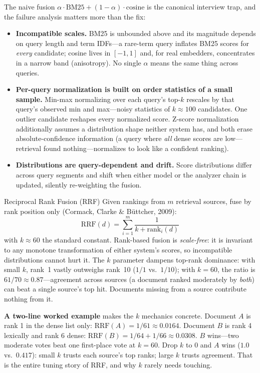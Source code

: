 The naive fusion $\alpha \cdot \text{BM25} + (1-\alpha) \cdot \text{cosine}$ is the canonical interview trap, and the failure analysis matters more than the fix:

\begin{itemize}
    \item \textbf{Incompatible scales.} BM25 is unbounded above and its magnitude depends on query length and term IDFs---a rare-term query inflates BM25 scores for \textit{every} candidate; cosine lives in $[-1, 1]$ and, for real embedders, concentrates in a narrow band (anisotropy). No single $\alpha$ means the same thing across queries.
    \item \textbf{Per-query normalization is built on order statistics of a small sample.} Min-max normalizing over each query's top-$k$ rescales by that query's observed min and max---noisy statistics of $k \approx 100$ candidates. One outlier candidate reshapes every normalized score. Z-score normalization additionally assumes a distribution shape neither system has, and both erase absolute-confidence information (a query where \textit{all} dense scores are low---retrieval found nothing---normalizes to look like a confident ranking).
    \item \textbf{Distributions are query-dependent and drift.} Score distributions differ across query segments and shift when either model or the analyzer chain is updated, silently re-weighting the fusion.
\end{itemize}

\begin{mathresult}{Reciprocal Rank Fusion (RRF)}
Given rankings from $m$ retrieval sources, fuse by rank position only (Cormack, Clarke \& B\"uttcher, 2009):
\[
\text{RRF}(d) = \sum_{i=1}^{m} \frac{1}{k + \text{rank}_i(d)}
\]
with $k \approx 60$ the standard constant. Rank-based fusion is \textit{scale-free}: it is invariant to any monotone transformation of either system's scores, so incompatible distributions cannot hurt it. The $k$ parameter dampens top-rank dominance: with small $k$, rank~1 vastly outweighs rank~10 ($1/1$ vs.\ $1/10$); with $k = 60$, the ratio is $61/70 \approx 0.87$---agreement across sources (a document ranked moderately by \textit{both}) can beat a single source's top hit. Documents missing from a source contribute nothing from it.
\end{mathresult}

\textbf{A two-line worked example} makes the $k$ mechanics concrete. Document $A$ is rank 1 in the dense list only: $\text{RRF}(A) = 1/61 \approx 0.0164$. Document $B$ is rank 4 lexically and rank 6 dense: $\text{RRF}(B) = 1/64 + 1/66 \approx 0.0308$. $B$ wins---two moderate votes beat one first-place vote at $k = 60$. Drop $k$ to 0 and $A$ wins ($1.0$ vs.\ $0.417$): small $k$ trusts each source's top ranks; large $k$ trusts agreement. That is the entire tuning story of RRF, and why $k$ rarely needs touching.

